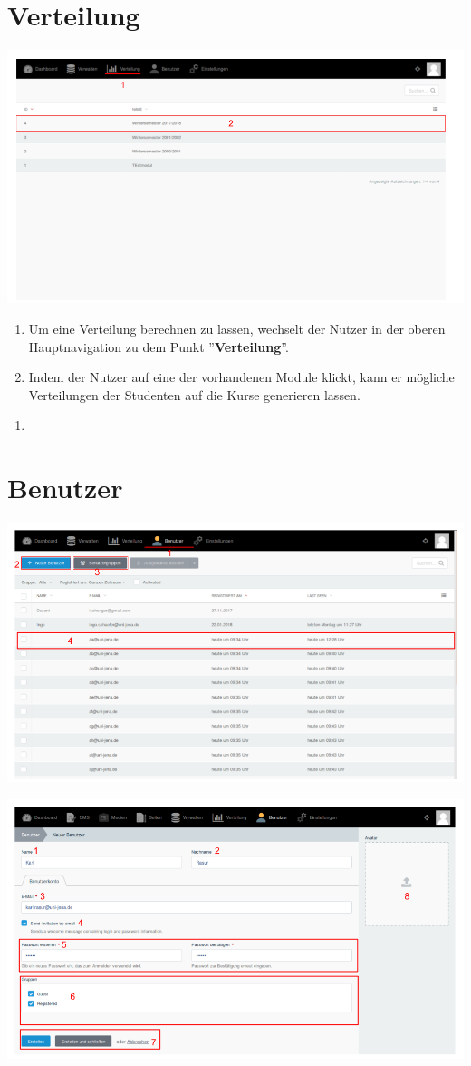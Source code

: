   
  \section{Verteilung}
  \label{section:distribution}
  
  \includegraphics[scale=0.3]{backend/img/distribution_1.png}
  
  \begin{enumerate}
   \item Um eine Verteilung berechnen zu lassen, wechselt der Nutzer in der oberen Hauptnavigation zu dem Punkt ''\textbf{Verteilung}''.
   \item Indem der Nutzer auf eine der vorhandenen Module klickt, kann er mögliche Verteilungen der Studenten auf die Kurse generieren lassen.
  \end{enumerate}
  
  \begin{enumerate}
   \item 
  \end{enumerate}

  
  \section{Benutzer}
  \label{section:users}
  
  \includegraphics[scale=0.3]{backend/img/users_1.png}
  
  \includegraphics[scale=0.3]{backend/img/neuer_benutzer.png}
    